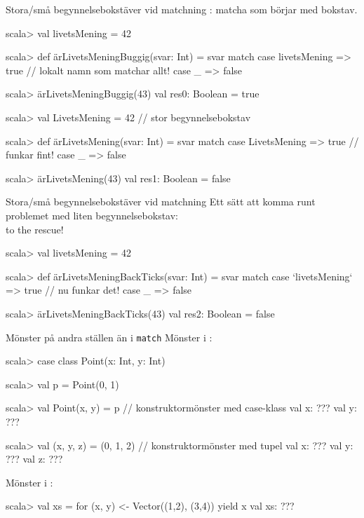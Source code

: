\begin{Slide}{Stora/små begynnelsebokstäver vid matchning}
: matcha  som börjar med  bokstav.
\begin{REPL}
scala> val livetsMening = 42

scala> def ärLivetsMeningBuggig(svar: Int) = svar match 
         case livetsMening => true    // lokalt namn som matchar allt!
         case _ => false

scala> ärLivetsMeningBuggig(43)
val res0: Boolean = true

scala> val LivetsMening = 42   // stor begynnelsebokstav

scala> def ärLivetsMening(svar: Int) = svar match 
         case LivetsMening => true    // funkar fint!
         case _ => false

scala> ärLivetsMening(43)
val res1: Boolean = false
\end{REPL}
\end{Slide}


\begin{Slide}{Stora/små begynnelsebokstäver vid matchning}
Ett sätt att komma runt problemet med liten begynnelsebokstav: \\
 to the rescue!
\begin{REPL}
scala> val livetsMening = 42

scala> def ärLivetsMeningBackTicks(svar: Int) = svar match 
         case `livetsMening` => true    // nu funkar det!
         case _ => false

scala> ärLivetsMeningBackTicks(43)
val res2: Boolean = false
\end{REPL}
\end{Slide}

\ifkompendium\else
\begin{Slide}{Mönster på andra ställen än i \texttt{match}}\SlideFontSmall
Mönster i :
\vspace{-0.25em}\begin{REPL}
scala> case class Point(x: Int, y: Int)

scala> val p = Point(0, 1)

scala> val Point(x, y) = p          // konstruktormönster med case-klass
val x: ???
val y: ???

scala> val (x, y, z) = (0, 1, 2)    // konstruktormönster med tupel
val x: ???
val y: ???
val z: ???

\end{REPL}
Mönster i :
\vspace{-0.25em}\begin{REPL}
scala> val xs = for (x, y) <- Vector((1,2), (3,4)) yield x
val xs: ???
\end{REPL}

\end{Slide}
\fi

